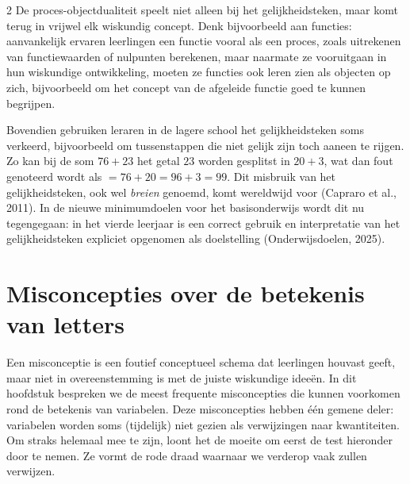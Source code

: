 \begin{multicols}{2}
De proces-objectdualiteit speelt niet alleen bij het gelijkheidsteken, maar komt terug in vrijwel elk wiskundig concept. Denk bijvoorbeeld aan functies: aanvankelijk ervaren leerlingen een functie vooral als een proces, zoals uitrekenen van functiewaarden of nulpunten berekenen, maar naarmate ze vooruitgaan in hun wiskundige ontwikkeling, moeten ze functies ook leren zien als objecten op zich, bijvoorbeeld om het concept van de afgeleide functie goed te kunnen begrijpen.

Bovendien gebruiken leraren in de lagere school het gelijkheidsteken soms verkeerd, bijvoorbeeld om tussenstappen die niet gelijk zijn toch aaneen te rijgen. Zo kan bij de som $76+23$ het getal $23$ worden gesplitst in $20+3$, wat dan fout genoteerd wordt als $=76+20=96+3=99$. Dit misbruik van het gelijkheidsteken, ook wel \textit{breien} genoemd, komt wereldwijd voor (Capraro et al., 2011). In de nieuwe minimumdoelen voor het basisonderwijs wordt dit nu tegengegaan: in het vierde leerjaar is een correct gebruik en interpretatie van het gelijkheidsteken expliciet opgenomen als doelstelling (Onderwijsdoelen, 2025).

\section{Misconcepties over de betekenis van letters}
Een misconceptie is een foutief conceptueel schema dat leerlingen houvast geeft, maar niet in overeenstemming is met de juiste wiskundige ideeën. In dit hoofdstuk bespreken we de meest frequente misconcepties die kunnen voorkomen rond de betekenis van variabelen. Deze misconcepties hebben één gemene deler: variabelen worden soms (tijdelijk) niet gezien als verwijzingen naar kwantiteiten. Om straks helemaal mee te zijn, loont het de moeite om eerst de test hieronder door te nemen. Ze vormt de rode draad waarnaar we verderop vaak zullen verwijzen.

\end{multicols}
